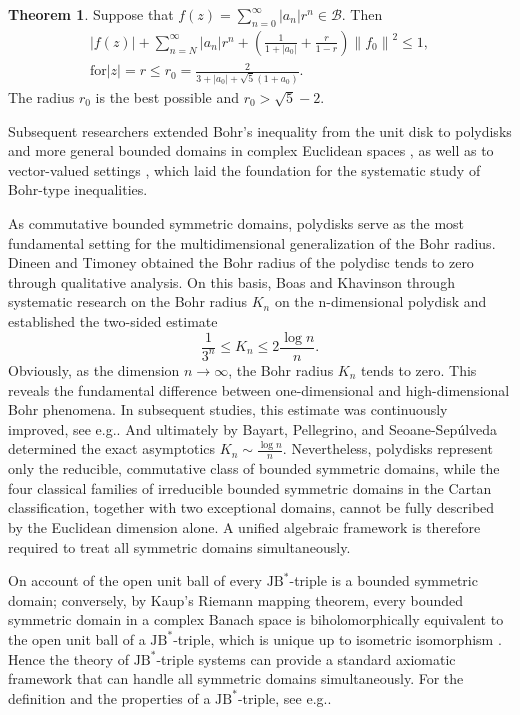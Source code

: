 \documentclass{birkjour}
\theoremstyle{plain}
\theoremstyle{definition}
\theoremstyle{definition}
\newtheorem{theorem}{Theorem}
\begin{document}
\begin{theorem}\cite{ref32}
	Suppose that $\mathit{f}(z)=\sum_{n=0}^{\infty} \left| a_{n} \right| r^{n} \in \mathcal{B}$. Then
	\begin{align*}
		\left| \mathit{f}(z) \right|+\sum_{n=N}^{\infty} \left| a_n \right| r^{n} +(\frac{1}{1+\left | a_0 \right | } +\frac{r}{1-r} )\left \| f_0 \right \| ^ 2 \le 1,\\
		\text{for} \left| z \right | =r \le r_0=\frac{2}{3+\left | a_0 \right |+\sqrt{5}(1+a_0)}.
	\end{align*}
	The radius $r_0$ is the best possible and $r_0>\sqrt{5}-2$.
\end{theorem}
Subsequent researchers extended Bohr's inequality from the unit disk to polydisks and more general bounded domains in complex Euclidean spaces \cite{ref3,ref4}, as well as to vector-valued settings \cite{ref34}, which laid the foundation for the systematic study of Bohr-type inequalities.

As commutative bounded symmetric domains, polydisks serve as the most fundamental setting for the multidimensional generalization of the Bohr radius. Dineen and Timoney \cite{ref17} obtained the Bohr radius of the polydisc tends to zero through qualitative analysis. On this basis, Boas and Khavinson \cite{ref8} through systematic research on the Bohr radius $K_n$ on the n-dimensional polydisk and established the two-sided estimate
    \begin{equation*}
       \frac1{3^n}\le K_n\le 2\frac{\log n}{n}.
    \end{equation*}
Obviously, as the dimension $n \to \infty$, the Bohr radius $K_n$ tends to zero. This reveals the fundamental difference between one-dimensional and high-dimensional Bohr phenomena. In subsequent studies, this estimate was continuously improved, see e.g.\cite{ref14,ref16}. And ultimately by Bayart, Pellegrino, and Seoane-Sepúlveda \cite{ref6} determined the exact asymptotics $K_n\sim \frac{\log n}{n}$. Nevertheless, polydisks represent only the reducible, commutative class of bounded symmetric domains, while the four classical families of irreducible bounded symmetric domains in the Cartan classification, together with two exceptional domains, cannot be fully described by the Euclidean dimension alone. A unified algebraic framework is therefore required to treat all symmetric domains simultaneously.

On account of the open unit ball of every $\text{JB}^*$-triple is a bounded symmetric domain; conversely, by Kaup's Riemann mapping theorem, every bounded symmetric domain in a complex Banach space is biholomorphically equivalent to the open unit ball of a $\text{JB}^*$-triple, which is unique up to isometric isomorphism \cite{ref30}. Hence the theory of $\text{JB}^*$-triple systems can provide a standard axiomatic framework that can handle all symmetric domains simultaneously. For the definition and the properties of a $\text{JB}^*$-triple, see e.g.\cite{ref12,ref13}.
\end{document}
